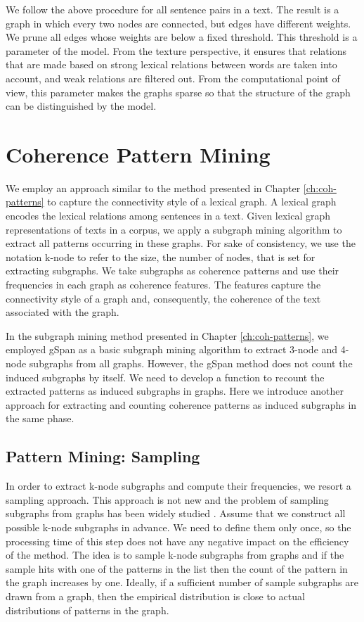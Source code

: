 We follow the above procedure for all sentence pairs in a text. 
The result is a graph in which every two nodes are connected, but edges have different weights.   
We prune all edges whose weights are below a fixed threshold. 
This threshold is a parameter of the model.
From the texture perspective, it ensures that relations that are made based on strong lexical relations between words are taken into account, and weak relations are filtered out. 
From the computational point of view, this parameter makes the graphs sparse so that the structure of the graph can be distinguished by the model. 

\section{Coherence Pattern Mining} 

We employ an approach similar to the method presented in Chapter \ref{ch:coh-patterns} to capture the connectivity style of a lexical graph. 
A lexical graph encodes the lexical relations among sentences in a text. 
Given lexical graph representations of texts in a corpus, we apply a subgraph mining algorithm to extract all patterns occurring in these graphs. 
For sake of consistency, we use the notation k-node to refer to the size, the number of nodes, that is set for extracting subgraphs. 
We take subgraphs as coherence patterns and use their frequencies in each graph as coherence features. 
The features capture the connectivity style of a graph and, consequently, the coherence of the text associated with the graph.  

In the subgraph mining method presented in Chapter \ref{ch:coh-patterns}, we employed gSpan as a basic subgraph mining algorithm to extract 3-node and 4-node subgraphs from all graphs. 
However, the gSpan method does not count the induced subgraphs by itself. 
We need to develop a function to recount the extracted patterns as induced subgraphs in graphs.  
Here we introduce another approach for extracting and counting coherence patterns as induced subgraphs in the same phase.  

\subsection{Pattern Mining: Sampling}
In order to extract k-node subgraphs and compute their frequencies, we resort a sampling approach. 
This approach is not new and the problem of sampling subgraphs from graphs has been widely studied \cite{weissman03,shervashidze09}. 
Assume that we construct all possible k-node subgraphs in advance. 
We need to define them only once, so the processing time of this step does not have any negative impact on the efficiency of the method.  
The idea is to sample k-node subgraphs from graphs and if the sample hits with one of the patterns in the list then the count of the pattern in the graph increases by one. 
Ideally, if a sufficient number of sample subgraphs are drawn from a graph, then the empirical distribution is close to actual distributions of patterns in the graph. 

